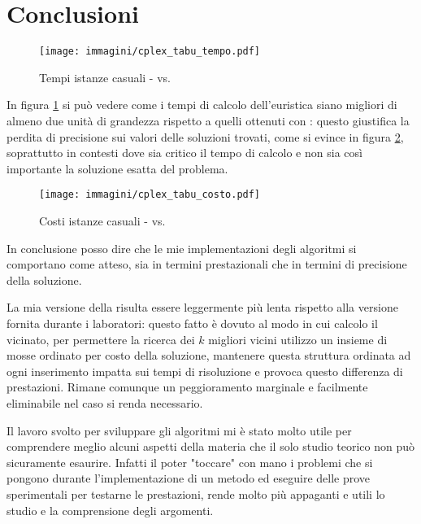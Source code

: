 \section{Conclusioni}

\begin{figure}[htb]
	\centering
	\texttt{[image: immagini/cplex\_tabu\_tempo.pdf]}
	\caption{Tempi istanze casuali -  vs. \tabu}
	\label{fig:tempi cplex tabu}
\end{figure}

In figura \ref{fig:tempi cplex tabu} si può vedere come i tempi di calcolo dell'euristica \tabu siano migliori di almeno due unità di grandezza rispetto a quelli ottenuti con : questo giustifica la perdita di precisione sui valori delle soluzioni trovati, come si evince in figura \ref{fig:costi cplex tabu}, soprattutto in contesti dove sia critico il tempo di calcolo e non sia così importante la soluzione esatta del problema.

\begin{figure}[htb]
	\centering
	\texttt{[image: immagini/cplex\_tabu\_costo.pdf]}
	\caption{Costi istanze casuali -  vs. \tabu}
	\label{fig:costi cplex tabu}
\end{figure}

In conclusione posso dire che le mie implementazioni degli algoritmi si comportano come atteso, sia in termini prestazionali che in termini di precisione della soluzione.

La mia versione della \tabu risulta essere leggermente più lenta rispetto alla versione fornita durante i laboratori: questo fatto è dovuto al modo in cui calcolo il vicinato, per permettere la ricerca dei $k$ migliori vicini utilizzo un insieme di mosse ordinato per costo della soluzione, mantenere questa struttura ordinata ad ogni inserimento impatta sui tempi di risoluzione e provoca questo differenza di prestazioni.
Rimane comunque un peggioramento marginale e facilmente eliminabile nel caso si renda necessario.

Il lavoro svolto per sviluppare gli algoritmi mi è stato molto utile per comprendere meglio alcuni aspetti della materia che il solo studio teorico non può sicuramente esaurire. Infatti il poter "toccare" con mano i problemi che si pongono durante l'implementazione di un metodo ed eseguire delle prove sperimentali per testarne le prestazioni, rende molto più appaganti e utili lo studio e la comprensione degli argomenti.
